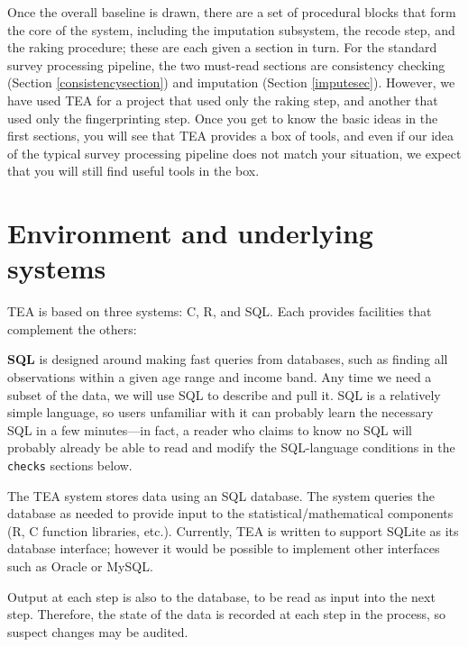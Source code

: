 \documentclass{article}
\begin{document}
Once the overall baseline is drawn, there are a set of procedural blocks that form the
core of the system, including the imputation subsystem, the recode step, and the raking
procedure; these are each given a section in turn. For the standard survey processing
pipeline, the two must-read sections are consistency checking (Section \ref{consistencysection})
and imputation (Section \ref{imputesec}). However, we have used TEA for a project that
used only the raking step, and another that used only the fingerprinting step. Once
you get to know the basic ideas in the first sections, you will see that TEA provides
a box of tools, and even if our idea of the typical survey processing pipeline does
not match your situation, we expect that you will still find useful tools in the box.

\section{Environment and underlying systems}
TEA is based on three systems: C, R, and SQL. Each provides facilities that complement the others:

{\bf SQL} is designed around making fast queries from databases, such as finding all
observations within a given age range and income band. Any time we need a subset of the
data, we will use SQL to describe and pull it. SQL is a relatively simple language, so
users unfamiliar with it can probably learn the necessary SQL in a few
minutes---in fact, a reader who claims to know no SQL will probably already be able
to read and modify the SQL-language conditions in the {\tt checks} sections below.

The TEA system stores data using an SQL database. The system queries the database as
needed to provide input to the statistical/mathematical components (R, C function libraries, etc.).
Currently, TEA is written to support SQLite as its database interface; however it would
be possible to implement other interfaces such as Oracle or MySQL. 

Output at each step is also to the database, to be read as input into the next
step. Therefore, the state of the data is recorded at each step in the process, so
suspect changes may be audited.
\end{document}
